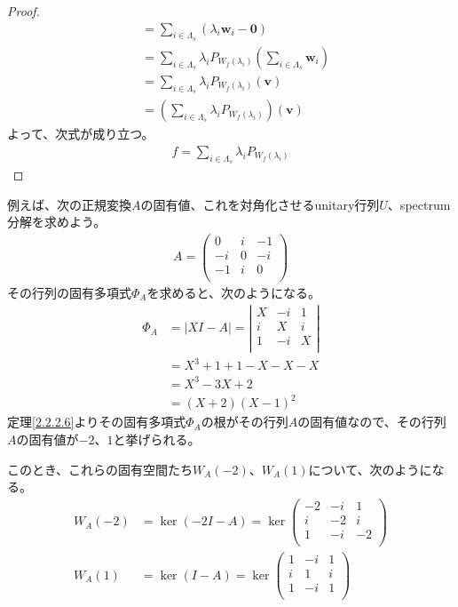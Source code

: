 \documentclass[dvipdfmx]{jsarticle}
\begin{document}
\begin{proof}
\begin{align*}
&= \sum_{i \in \varLambda_{s}} \left( \lambda_{i}\mathbf{w}_{i} - \mathbf{0} \right)\\
&= \sum_{i \in \varLambda_{s}} {\lambda_{i}P_{W_{f}\left( \lambda_{i} \right)}\left( \sum_{i \in \varLambda_{s}} \mathbf{w}_{i} \right)}\\
&= \sum_{i \in \varLambda_{s}} {\lambda_{i}P_{W_{f}\left( \lambda_{i} \right)}\left( \mathbf{v} \right)}\\
&= \left( \sum_{i \in \varLambda_{s}} {\lambda_{i}P_{W_{f}\left( \lambda_{i} \right)}} \right)\left( \mathbf{v} \right)
\end{align*}
よって、次式が成り立つ。
\begin{align*}
f = \sum_{i \in \varLambda_{s}} {\lambda_{i}P_{W_{f}\left( \lambda_{i} \right)}}
\end{align*}
\end{proof}\par
例えば、次の正規変換$A$の固有値、これを対角化させるunitary行列$U$、spectrum分解を求めよう。
\begin{align*}
A = \begin{pmatrix}
0 & i & - 1 \\
 - i & 0 & - i \\
 - 1 & i & 0 \\
\end{pmatrix}
\end{align*}
その行列の固有多項式$\varPhi_{A}$を求めると、次のようになる。
\begin{align*}
\varPhi_{A} &= |XI - A| = \left| \begin{matrix}
X & - i & 1 \\
i & X & i \\
1 & - i & X \\
\end{matrix} \right|\\
&= X^{3} + 1 + 1 - X - X - X\\
&= X^{3} - 3X + 2\\
&= (X + 2)(X - 1)^{2}
\end{align*}
定理\ref{2.2.2.6}よりその固有多項式$\varPhi_{A}$の根がその行列$A$の固有値なので、その行列$A$の固有値が$- 2$、$1$と挙げられる。\par
このとき、これらの固有空間たち$W_{A}( - 2)$、$W_{A}(1)$について、次のようになる。
\begin{align*}
W_{A}( - 2) &= \ker( - 2I - A) = \ker\begin{pmatrix}
 - 2 & - i & 1 \\
i & - 2 & i \\
1 & - i & - 2 \\
\end{pmatrix}\\
W_{A}(1) &= \ker(I - A) = \ker\begin{pmatrix}
1 & - i & 1 \\
i & 1 & i \\
1 & - i & 1 \\
\end{pmatrix}
\end{align*}
\end{document}
